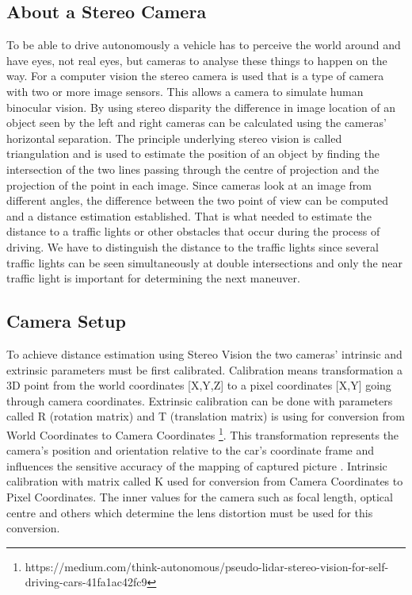 \documentclass[letterpaper, 10 pt, conference]{ieeeconf} %
\begin{document}
\subsection{About a Stereo Camera}
To be able to drive autonomously a vehicle has to perceive the world around and have eyes, not real eyes, but cameras to analyse these things to happen on the way. For a computer vision the stereo camera is used that is a type of camera with two or more image sensors. This allows a camera to simulate human binocular vision. By using stereo disparity the difference in image location of an object seen by the left and right cameras can be calculated using the cameras' horizontal separation. The principle underlying stereo vision is called triangulation and is used to estimate the position of an object by finding the intersection of the two lines passing through the centre of projection and the projection of the point in each image. Since cameras look at an image from different angles, the difference between the two point of view can be computed and a distance estimation established. That is what needed to estimate the distance to a traffic lights or other obstacles that occur during the process of driving. We have to distinguish the distance to the traffic lights since several traffic lights can be seen simultaneously at double intersections and only the near traffic light is important for determining the next maneuver. 

\subsection{Camera Setup}

To achieve distance estimation using Stereo Vision the two cameras' intrinsic and extrinsic parameters must be first calibrated. Calibration means transformation a 3D point from the world coordinates [X,Y,Z] to a pixel coordinates [X,Y] going through camera coordinates. Extrinsic calibration can be done with parameters called R (rotation matrix) and T (translation matrix) is using for conversion from World Coordinates to Camera Coordinates \footnote{https://medium.com/think-autonomous/pseudo-lidar-stereo-vision-for-self-driving-cars-41fa1ac42fc9}. This transformation represents the camera’s position and orientation relative to the car’s coordinate frame and influences the sensitive accuracy of the mapping of captured picture \cite{c4}. Intrinsic calibration with matrix called K used for conversion from Camera Coordinates to Pixel Coordinates. The inner values for the camera such as focal length, optical centre and others which determine the lens distortion must be used for this conversion. 
\end{document}
